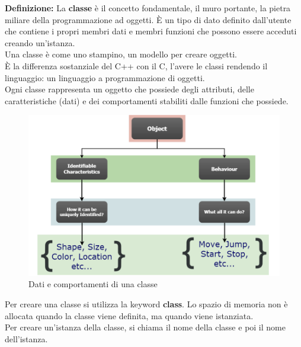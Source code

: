 \textsf{\small \textbf{Definizione: } La \textbf{classe} è il concetto fondamentale, il muro portante, la pietra miliare della programmazione ad oggetti. È un tipo di dato definito dall'utente che contiene i propri membri dati e membri funzioni che possono essere acceduti creando un'istanza.} \\ %

\textsf{\small Una classe è come uno stampino, un modello per creare oggetti. } \\

\textsf{\small È la differenza sostanziale del C++ con il C, l'avere le classi rendendo il linguaggio: un linguaggio a programmazione di oggetti. } \\ %

\textsf{\small Ogni classe rappresenta un oggetto che possiede degli attributi, delle caratteristiche (dati) e dei comportamenti stabiliti dalle funzioni che possiede. } \\

\begin{figure}[ht]
	\centering
	\includegraphics[width=1\textwidth, height=1\textheight, keepaspectratio]{./imgs/class_data_and_behaviour.png}
	\caption{Dati e comportamenti di una classe}
	\label{fig:class_data_and_behaviour}
\end{figure}

\textsf{\small Per creare una classe si utilizza la keyword \textbf{class}. Lo spazio di memoria non è allocata quando la classe viene definita, ma quando viene istanziata. } \\

\textsf{\small Per creare un'istanza della classe, si chiama il nome della classe e poi il nome dell'istanza.} \\

